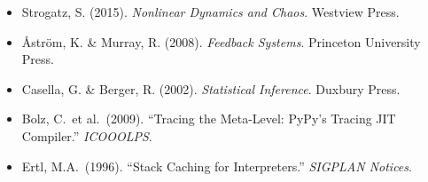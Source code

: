 \begin{itemize}
  \item Strogatz, S. (2015). \emph{Nonlinear Dynamics and Chaos}. Westview Press.
  \item \r{A}str\"{o}m, K. \& Murray, R. (2008). \emph{Feedback Systems}.
    Princeton University Press.
  \item Casella, G. \& Berger, R. (2002). \emph{Statistical Inference}.
    Duxbury Press.
  \item Bolz, C.\ et al.\ (2009). ``Tracing the Meta-Level: PyPy's Tracing
    JIT Compiler.'' \emph{ICOOOLPS}.
  \item Ertl, M.A.\ (1996). ``Stack Caching for Interpreters.'' \emph{SIGPLAN
    Notices}.
\end{itemize}
